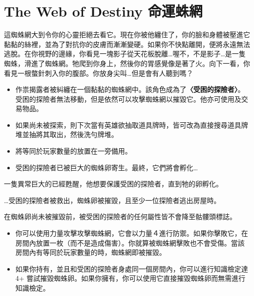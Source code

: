 
\chapter{The Web of Destiny 命運蛛網}

\begin{HauntStory}
  這蜘蛛網大到令你的心靈拒絕去看它。現在你被他纏住了，你的臉和身體被壓進它黏黏的絲裡，並為了對抗你的皮膚而漸漸變硬。如果你不快點離開，便將永遠無法逃脫。在你視野的邊緣，你看見一塊影子從天花板脫離…喔不，不是影子…是一隻蜘蛛，滑進了蜘蛛網。牠爬到你身上，然後你的胃感覺像是著了火。向下一看，你看見一根螫針刺入你的腹部。你放身尖叫…但是會有人聽到嗎？
\end{HauntStory}

\vspace*{-1em}
\begin{itemize}
  \item 作祟揭露者被糾纏在一個黏黏的蜘蛛網中。該角色成為了\textbf{〈受困的探險者〉}。受困的探險者無法移動，但是依然可以攻擊蜘蛛網以摧毀它。他亦可使用及交易物品。
  \item 如果尚未被探索，則下次當有英雄欲抽取道具牌時，皆可改為直接搜尋道具牌堆並抽將其取出，然後洗勻牌堆。
  \item 將等同於玩家數量的放置在一旁備用。
  \item 受困的探險者已被巨大的蜘蛛卵寄生。最終，它們將會孵化…
\end{itemize}

一隻異常巨大的已經甦醒，他想要保護受困的探險者，直到牠的卵孵化。

…受困的探險者被救出，蜘蛛卵被摧毀，且至少一位探險者逃出房屋時。

\vfill\null\pagebreak

在蜘蛛卵尚未被摧毀前，被受困的探險者的任何屬性皆不會降至骷髏頭標誌。
\begin{itemize}
  \item 你可以使用力量攻擊攻擊蜘蛛網，它會以力量４進行防禦。如果你擊敗它，在房間內放置一枚（而不是造成傷害）。你就算被蜘蛛網擊敗也不會受傷。當該房間內有等同於玩家數量的時，蜘蛛網即被摧毀。
  \item 如果你持有，並且和受困的探險者身處同一個房間內，你可以進行知識檢定達 4+ 嘗試摧毀蜘蛛卵。如果你擁有，你可以使用它直接摧毀蜘蛛卵而無需進行知識檢定。
\end{itemize}

